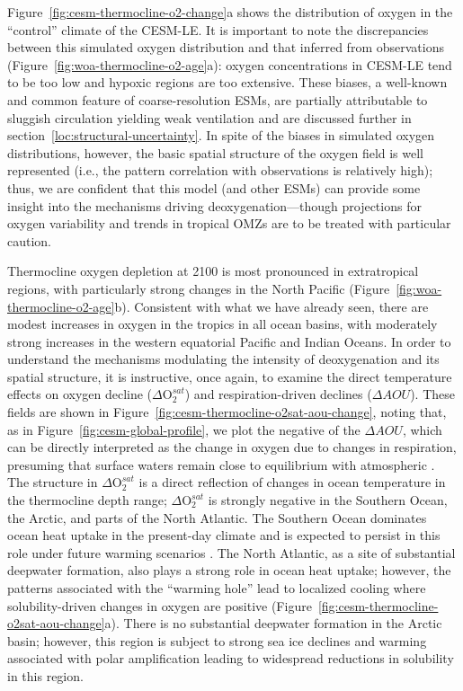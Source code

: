 \documentclass{report_chapter}
\begin{document}
Figure~\ref{fig:cesm-thermocline-o2-change}a shows the distribution of oxygen in the ``control'' climate of the CESM-LE.
It is important to note the discrepancies between this simulated oxygen distribution and that inferred from observations (Figure~\ref{fig:woa-thermocline-o2-age}a): oxygen concentrations in CESM-LE tend to be too low and hypoxic regions are too extensive.
These biases, a well-known and common feature of coarse-resolution ESMs, are partially attributable to sluggish circulation yielding weak ventilation and are discussed further in section~\ref{loc:structural-uncertainty}.
In spite of the biases in simulated oxygen distributions, however, the basic spatial structure of the oxygen field is well represented (i.e., the pattern correlation with observations is relatively high); thus, we are confident that this model (and other ESMs) can provide some insight into the mechanisms driving deoxygenation---though projections for oxygen variability and trends in tropical OMZs are to be treated with particular caution.

Thermocline oxygen depletion at 2100 is most pronounced in extratropical regions, with particularly strong changes in the North Pacific (Figure~\ref{fig:woa-thermocline-o2-age}b).
Consistent with what we have already seen, there are modest increases in oxygen in the tropics in all ocean basins, with moderately strong increases in the western equatorial Pacific and Indian Oceans.
In order to understand the mechanisms modulating the intensity of deoxygenation and its spatial structure, it is instructive, once again, to examine the direct temperature effects on oxygen decline ($\Delta\mathrm{O}_2^{sat}$) and respiration-driven declines ($\Delta{}AOU$).
These fields are shown in Figure~\ref{fig:cesm-thermocline-o2sat-aou-change}, noting that, as in Figure~\ref{fig:cesm-global-profile}, we plot the negative of the $\Delta{}AOU$, which can be directly interpreted as the change in oxygen due to changes in respiration, presuming that surface waters remain close to  equilibrium with atmospheric \OO{}.
The structure in $\Delta\mathrm{O}_2^{sat}$ is a direct reflection of changes in ocean temperature in the thermocline depth range; $\Delta\mathrm{O}_2^{sat}$ is strongly negative in the Southern Ocean, the Arctic, and parts of the North Atlantic.
The Southern Ocean dominates ocean heat uptake in the present-day climate \citep{Talley-Feely-etal-2015} and is expected to persist in this role under future warming scenarios \citep{Frolicher-Sarmiento-etal-2015}.
The North Atlantic, as a site of substantial deepwater formation, also plays a strong role in ocean heat uptake; however, the patterns associated with the ``warming hole'' lead to localized cooling where solubility-driven changes in oxygen are positive (Figure~\ref{fig:cesm-thermocline-o2sat-aou-change}a).
There is no substantial deepwater formation in the Arctic basin; however, this region is subject to strong sea ice declines and warming associated with polar amplification \citep{Screen-Simmonds-2010} leading to widespread reductions in solubility in this region.
\end{document}
